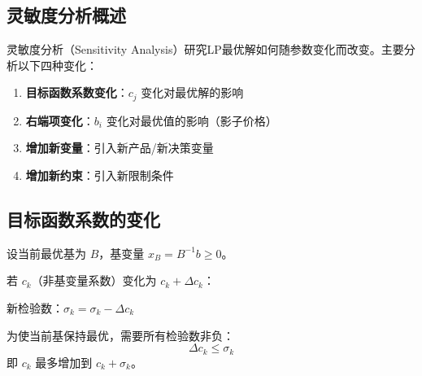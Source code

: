 \subsection{灵敏度分析概述}

灵敏度分析（Sensitivity Analysis）研究LP最优解如何随参数变化而改变。主要分析以下四种变化：

\begin{conceptbox}[灵敏度分析的四种情形]
\begin{enumerate}
    \item \textbf{目标函数系数变化}：$c_j$ 变化对最优解的影响
    \item \textbf{右端项变化}：$b_i$ 变化对最优值的影响（影子价格）
    \item \textbf{增加新变量}：引入新产品/新决策变量
    \item \textbf{增加新约束}：引入新限制条件
\end{enumerate}
\end{conceptbox}

\subsection{目标函数系数的变化}

设当前最优基为 $B$，基变量 $x_B = B^{-1}b \geq 0$。

若 $c_k$（非基变量系数）变化为 $c_k + \Delta c_k$：

新检验数：$\hat{\sigma}_k = \sigma_k - \Delta c_k$

\begin{theorem}[$c_k$ 的变化范围]
为使当前基保持最优，需要所有检验数非负：
\[
\Delta c_k \leq \sigma_k
\]
即 $c_k$ 最多增加到 $c_k + \sigma_k$。
\end{theorem}

